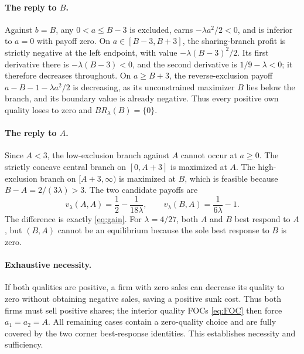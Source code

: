 \documentclass[11pt]{article}
\begin{document}
\paragraph{The reply to $B$.}
Against $b=B$, any $0<a\leq B-3$
is excluded, earns $-\lambda a^2/2<0$,
and is inferior to $a=0$ with payoff zero.
On $a\in[B-3,B+3]$, the sharing-branch
profit is strictly negative at the left
endpoint, with value
$-\lambda(B-3)^2/2$.
Its first derivative there is
$-\lambda(B-3)<0$, and the second
derivative is $1/9-\lambda<0$;
it therefore decreases throughout.
On $a\geq B+3$, the reverse-exclusion
payoff $a-B-1-\lambda a^2/2$
is decreasing, as its unconstrained
maximizer $B$ lies below the branch,
and its boundary value is already
negative. Thus every positive own
quality loses to zero and
$BR_\lambda(B)=\{0\}$.

\paragraph{The reply to $A$.}
Since $A<3$, the low-exclusion branch
against $A$ cannot occur at $a\geq0$.
The strictly concave central branch
on $[0,A+3]$ is maximized at $A$.
The high-exclusion branch on
$[A+3,\infty)$ is maximized at
$B$, which is feasible because
$B-A=2/(3\lambda)>3$.
The two candidate payoffs are
\[
v_\lambda(A,A)=\frac12-\frac{1}{18\lambda},
\qquad
v_\lambda(B,A)=\frac{1}{6\lambda}-1.
\]
The difference is exactly
\eqref{eq:gain}. For $\lambda=4/27$,
both $A$ and $B$ best respond to $A$,
but $(B,A)$ cannot be an equilibrium
because the sole best response to
$B$ is zero.

\paragraph{Exhaustive necessity.}
If both qualities are positive,
a firm with zero sales can decrease
its quality to zero without obtaining
negative sales, saving a positive
sunk cost. Thus both firms must
sell positive shares; the interior
quality FOCs \eqref{eq:FOC}
then force $a_1=a_2=A$.
All remaining cases contain
a zero-quality choice and are
fully covered by the two corner
best-response identities. This
establishes necessity and sufficiency.
\end{document}
